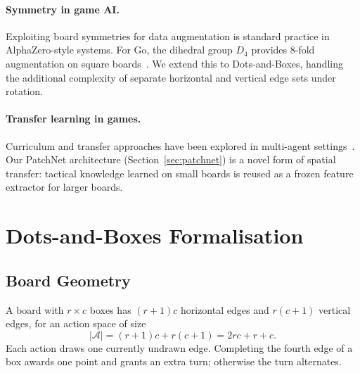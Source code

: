 \documentclass[11pt]{article}
\begin{document}
\paragraph{Symmetry in game AI.}
Exploiting board symmetries for data augmentation is standard practice
in AlphaZero-style systems. For Go, the dihedral group $D_4$ provides
8-fold augmentation on square boards~\cite{silver2017mastering}. We
extend this to Dots-and-Boxes, handling the additional complexity of
separate horizontal and vertical edge sets under rotation.

\paragraph{Transfer learning in games.}
Curriculum and transfer approaches have been explored in multi-agent
settings~\cite{bansal2018emergent}. Our PatchNet architecture
(Section~\ref{sec:patchnet}) is a novel form of spatial transfer:
tactical knowledge learned on small boards is reused as a frozen
feature extractor for larger boards.

\section{Dots-and-Boxes Formalisation}
\label{sec:game}

\subsection{Board Geometry}
A board with $r \times c$ boxes has $(r{+}1)c$ horizontal edges and
$r(c{+}1)$ vertical edges, for an action space of size
\begin{equation}
  |\mathcal{A}| = (r{+}1)c + r(c{+}1) = 2rc + r + c.
\end{equation}
Each action draws one currently undrawn edge. Completing the fourth edge
of a box awards one point and grants an extra turn; otherwise the turn
alternates.
\end{document}
